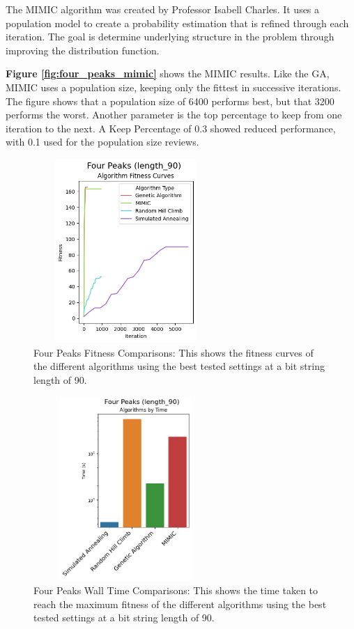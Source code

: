 \documentclass[letterpaper]{article} %
\begin{document}
The MIMIC algorithm was created by Professor Isabell Charles.  It uses a population model to create a probability estimation that is refined through each iteration.  The goal is determine underlying structure in the problem through improving the distribution function.

\textbf{Figure \ref{fig:four_peaks_mimic}} shows the MIMIC results.  Like the GA, MIMIC uses a population size, keeping only the fittest in successive iterations.  The figure shows that a population size of 6400 performs best, but that 3200 performs the worst.  Another parameter is the top percentage to keep from one iteration to the next.  A Keep Percentage of 0.3 showed reduced performance, with 0.1 used for the population size reviews. 

\begin{figure}[!htb]
\centering
\includegraphics[width=2.75in, height=2.75in]{figures/Four_Peaks_length_90_Algorithm_Fitness_Curves_.png}
\caption{Four Peaks Fitness Comparisons: This shows the fitness curves of the different algorithms using the best tested settings at a bit string length of 90.  }
\label{fig:four_peaks_fitness_comparison_90}
\end{figure}

\begin{figure}[!htb]
\centering
\includegraphics[width=2.75in, height=2.75in]{figures/Four_Peaks_length_90_Algorithms_by_Time_.png}
\caption{Four Peaks Wall Time Comparisons: This shows the time taken to reach the maximum fitness of the different algorithms using the best tested settings at a bit string length of 90.  }
\label{fig:four_peaks_walltime_comparison_90}
\end{figure}
\end{document}
